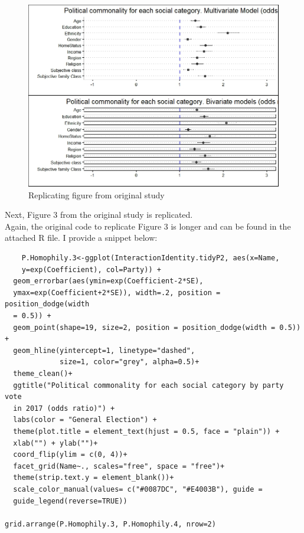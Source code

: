 \documentclass{article}
\begin{document}
\begin{figure} [H]
    \centering
    \includegraphics[width=1.3\textwidth]{Figure 2.jpeg}
    \caption{Replicating figure from original study}
    \label{fig:enter-label}
\end{figure}

Next, Figure 3 from the original study is replicated.
\\

Again, the original code to replicate Figure 3 is longer and can be found in the attached R file. I provide a snippet below:
\begin{verbatim}
    P.Homophily.3<-ggplot(InteractionIdentity.tidyP2, aes(x=Name,
    y=exp(Coefficient), col=Party)) + 
  geom_errorbar(aes(ymin=exp(Coefficient-2*SE), 
  ymax=exp(Coefficient+2*SE)), width=.2, position = position_dodge(width 
  = 0.5)) +
  geom_point(shape=19, size=2, position = position_dodge(width = 0.5)) +
  geom_hline(yintercept=1, linetype="dashed", 
             size=1, color="grey", alpha=0.5)+
  theme_clean()+ 
  ggtitle("Political commonality for each social category by party vote 
  in 2017 (odds ratio)") +
  labs(color = "General Election") +
  theme(plot.title = element_text(hjust = 0.5, face = "plain")) +
  xlab("") + ylab("")+
  coord_flip(ylim = c(0, 4))+
  facet_grid(Name~., scales="free", space = "free")+
  theme(strip.text.y = element_blank())+
  scale_color_manual(values= c("#0087DC", "#E4003B"), guide = 
  guide_legend(reverse=TRUE))

grid.arrange(P.Homophily.3, P.Homophily.4, nrow=2) 

\end{verbatim}
\end{document}

